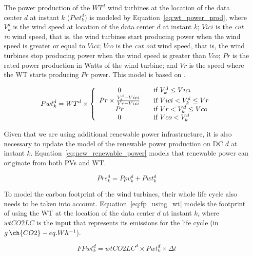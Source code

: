The power production of the $WT^d$ wind turbines at the location of the data center $d$ at instant $k$ ($Pwt^d_{k}$) is modeled by Equation~\ref{eq:wt_power_prod}, where $V^d_k$ is the wind speed at location of the data center $d$ at instant $k$; $Vici$ is the \textit{cut in} wind speed, that is, the wind turbines start producing power when the wind speed is greater or equal to $Vici$; $Vco$ is the \textit{cut out} wind speed, that is, the wind turbines stop producing power when the wind speed is greater than $Vco$; $Pr$ is the rated power production in Watts of the wind turbine; and $Vr$ is the speed where the WT starts producing $Pr$ power. This model is based on \cite{HADDAD2021100505}.


\begin{equation} \label{eq:wt_power_prod}
Pwt^d_{k} = WT^d \times \left\{ 
  \begin{array}{ c l }
    0   & \quad \textrm{if } V^d_k \leq Vici \\
    Pr \times \frac{V^d_k - Vici}{Vr - Vici}  & \quad \textrm{if } Vici < V^d_k \leq Vr \\
    Pr  & \quad \textrm{if } Vr < V^d_k \leq Vco \\
    0  & \quad \textrm{if } Vco < V^d_k \\
  \end{array}
\right.
\end{equation}


Given that we are using additional renewable power infrastructure, it is also necessary to update the model of the renewable power production on DC $d$ at instant $k$. Equation~\eqref{eq:new_renewable_power} models that renewable power can originate from both PVs and WT.

\begin{equation} \label{eq:new_renewable_power}
    Pre^d_{k}= Ppv^d_{k} + Pwt^d_{k}
\end{equation}


To model the carbon footprint of the wind turbines, their whole life cycle also needs to be taken into account. Equation~\eqref{eq:fp_using_wt} models the footprint of using the WT at the location of the data center $d$ at instant $k$, where $wtCO2LC$ is the input that represents its emissions for the life cycle (in $g\,\ch{CO2}-eq.Wh^{-1}$).

\begin{equation}\label{eq:fp_using_wt}
   FPwt^d_k =  wtCO2LC^d \times Pwt^d_{k}\times \Delta t
\end{equation}

